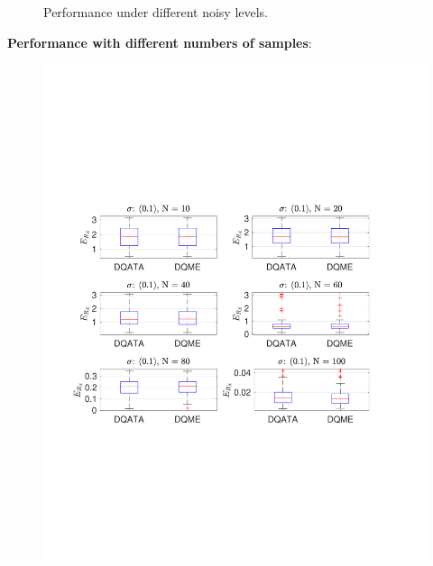 \documentclass[a4paper]{report}
\begin{document}
\begin{figure}
\caption{Performance under different noisy levels.}
\end{figure}

\textbf{Performance with different numbers of samples}:
\begin{figure}
\centering
\includegraphics[scale=0.6]{./hand_eye_figures/dq/dq_er_cmp_num}

\end{figure}
\end{document}
